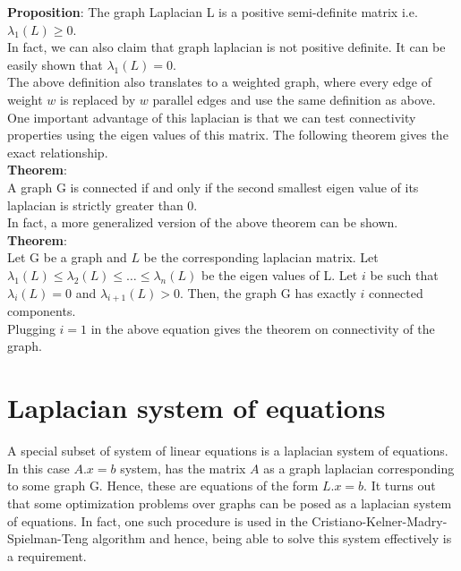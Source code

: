 \documentclass[BTech]{iitmdiss}
\begin{document}
		\textbf{Proposition}: The graph Laplacian L is a positive semi-definite matrix i.e. $\lambda_1(L) \geq 0$. \\
		
		In fact, we can also claim that graph laplacian is not positive definite. It can be easily shown that $\lambda_1(L) = 0$. \\
		
		The above definition also translates to a weighted graph, where every edge of weight $w$ is replaced by $w$ parallel edges and use the 
		same definition as above. \\
		
		One important advantage of this laplacian is that we can test connectivity properties using the eigen values of this matrix. The 
		following theorem gives the exact relationship. \\
		
		\textbf{Theorem}: \\
		A graph G is connected if and only if the second smallest eigen value of its laplacian is strictly greater than 0. \\
		
		In fact, a more generalized version of the above theorem can be shown. \\
		
		\textbf{Theorem}: \\
		Let G be a graph and $L$ be the corresponding laplacian matrix. Let $\lambda_1(L) \leq \lambda_2(L) \leq \ldots \leq \lambda_n(L)$ be the
		eigen values of L. Let $i$ be such that $\lambda_{i}(L) = 0 $ and $\lambda_{i+1}(L) > 0$.
		Then, the graph G has exactly $i$ connected components. \\
		
		Plugging $i=1$ in the above equation gives the theorem on connectivity of the graph. \\
		
		\section{Laplacian system of equations}
		  A special subset of system of linear equations is a laplacian system of equations. In this case $A.x = b$ system, has the matrix 
		  $A$ as a graph laplacian corresponding to some graph G. Hence, these are equations of the form $L.x = b$. It turns out that some 
		  optimization problems over graphs can be posed as a laplacian system of equations. In fact, one such procedure is used in the 
		  Cristiano-Kelner-Madry-Spielman-Teng algorithm and hence, being able to solve this system effectively is a requirement. \\
		  
\end{document}
